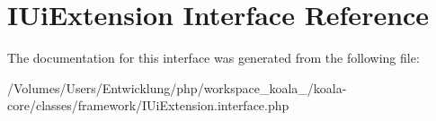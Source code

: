 \hypertarget{interface_i_ui_extension}{
\section{IUiExtension Interface Reference}
\label{interface_i_ui_extension}
}


The documentation for this interface was generated from the following file:\begin{DoxyCompactItemize}
\item 
/Volumes/Users/Entwicklung/php/workspace\_\-koala\_/koala-\/core/classes/framework/IUiExtension.interface.php\end{DoxyCompactItemize}
